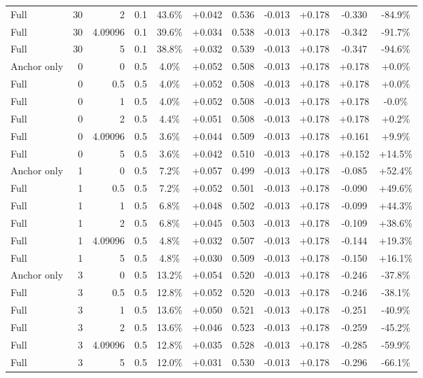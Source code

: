 \begin{table}[htbp]
\begin{tabular}{lrrrccccccc}
Full & 30 & 2 & 0.1 & 43.6\% & +0.042 & 0.536 & -0.013 & +0.178 & -0.330 & -84.9\% \\
Full & 30 & 4.09096 & 0.1 & 39.6\% & +0.034 & 0.538 & -0.013 & +0.178 & -0.342 & -91.7\% \\
Full & 30 & 5 & 0.1 & 38.8\% & +0.032 & 0.539 & -0.013 & +0.178 & -0.347 & -94.6\% \\
Anchor only & 0 & 0 & 0.5 & 4.0\% & +0.052 & 0.508 & -0.013 & +0.178 & +0.178 & +0.0\% \\
Full & 0 & 0.5 & 0.5 & 4.0\% & +0.052 & 0.508 & -0.013 & +0.178 & +0.178 & +0.0\% \\
Full & 0 & 1 & 0.5 & 4.0\% & +0.052 & 0.508 & -0.013 & +0.178 & +0.178 & -0.0\% \\
Full & 0 & 2 & 0.5 & 4.4\% & +0.051 & 0.508 & -0.013 & +0.178 & +0.178 & +0.2\% \\
Full & 0 & 4.09096 & 0.5 & 3.6\% & +0.044 & 0.509 & -0.013 & +0.178 & +0.161 & +9.9\% \\
Full & 0 & 5 & 0.5 & 3.6\% & +0.042 & 0.510 & -0.013 & +0.178 & +0.152 & +14.5\% \\
Anchor only & 1 & 0 & 0.5 & 7.2\% & +0.057 & 0.499 & -0.013 & +0.178 & -0.085 & +52.4\% \\
Full & 1 & 0.5 & 0.5 & 7.2\% & +0.052 & 0.501 & -0.013 & +0.178 & -0.090 & +49.6\% \\
Full & 1 & 1 & 0.5 & 6.8\% & +0.048 & 0.502 & -0.013 & +0.178 & -0.099 & +44.3\% \\
Full & 1 & 2 & 0.5 & 6.8\% & +0.045 & 0.503 & -0.013 & +0.178 & -0.109 & +38.6\% \\
Full & 1 & 4.09096 & 0.5 & 4.8\% & +0.032 & 0.507 & -0.013 & +0.178 & -0.144 & +19.3\% \\
Full & 1 & 5 & 0.5 & 4.8\% & +0.030 & 0.509 & -0.013 & +0.178 & -0.150 & +16.1\% \\
Anchor only & 3 & 0 & 0.5 & 13.2\% & +0.054 & 0.520 & -0.013 & +0.178 & -0.246 & -37.8\% \\
Full & 3 & 0.5 & 0.5 & 12.8\% & +0.052 & 0.520 & -0.013 & +0.178 & -0.246 & -38.1\% \\
Full & 3 & 1 & 0.5 & 13.6\% & +0.050 & 0.521 & -0.013 & +0.178 & -0.251 & -40.9\% \\
Full & 3 & 2 & 0.5 & 13.6\% & +0.046 & 0.523 & -0.013 & +0.178 & -0.259 & -45.2\% \\
Full & 3 & 4.09096 & 0.5 & 12.8\% & +0.035 & 0.528 & -0.013 & +0.178 & -0.285 & -59.9\% \\
Full & 3 & 5 & 0.5 & 12.0\% & +0.031 & 0.530 & -0.013 & +0.178 & -0.296 & -66.1\% \\

\end{tabular}
\end{table}
